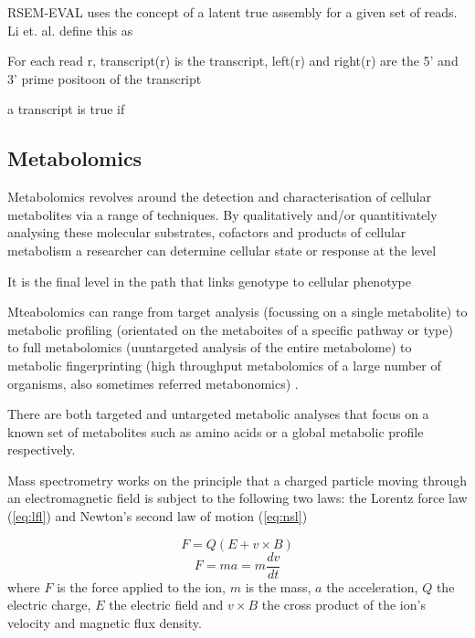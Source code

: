 

RSEM-EVAL uses the concept of a latent true assembly for a given set of 
reads.  Li et. al. define this as 

For each read r, transcript(r) is the transcript, left(r) and right(r) are the 5' and 3' prime
positoon of the transcript 

a transcript is true if 


\subsection{Metabolomics}

Metabolomics revolves around the detection and characterisation of cellular metabolites via a range of techniques.
By qualitatively and/or quantitivately analysing these molecular substrates, cofactors and products of cellular metabolism
a researcher can determine cellular state or response at the level 


It is the final level in the path that links genotype to cellular phenotype \citep{Fiehn2002}


Mteabolomics can range from target analysis (focussing on a single metabolite) to 
metabolic profiling (orientated on the metaboites of a specific pathway or type) to
full metabolomics (uuntargeted analysis of the entire metabolome) to metabolic fingerprinting
(high throughput metabolomics of a large number of organisms, also sometimes referred
metabonomics) \citep{Fiehn2002}.








There are both targeted and untargeted metabolic analyses that focus on a known set of metabolites such as
amino acids or a global metabolic profile respectively. 






Mass spectrometry works on the principle that a charged particle moving through an electromagnetic field
is subject to the following two laws: the Lorentz force law (\cref{eq:lfl}) and Newton's second law of motion (\cref{eq:nsl})

\[ F = Q(E + v \times B)\]
\[ F = ma = m\frac{dv}{dt}\]
where \(F\) is the force applied to the ion, \(m\) is the mass, \(a\) the acceleration, \(Q\) the electric charge,
\(E\) the electric field and \(v\times B\) the cross product of the ion's velocity and magnetic flux density. 

